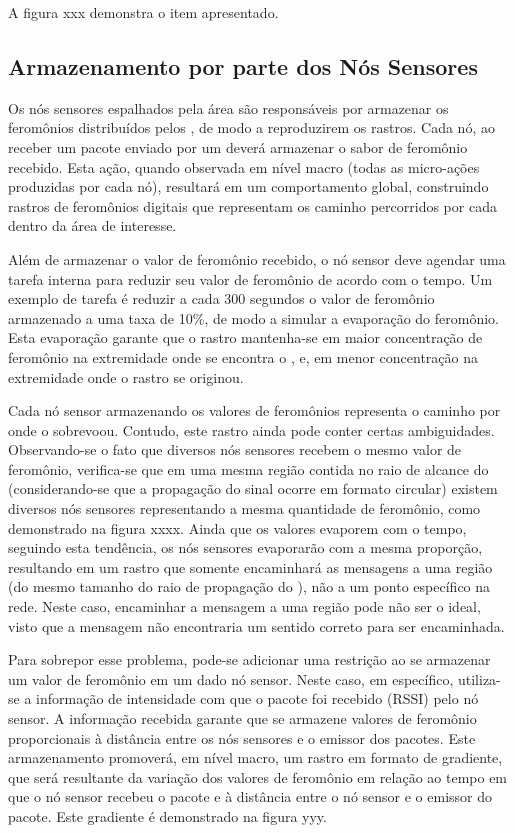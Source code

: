 A figura xxx demonstra o item apresentado.

\subsection{Armazenamento por parte dos Nós Sensores}
Os nós sensores espalhados pela área são responsáveis por armazenar os feromônios distribuídos pelos \vants, de modo a reproduzirem os rastros. Cada nó, ao receber um pacote enviado por um \vant deverá armazenar o sabor de feromônio recebido. Esta ação, quando observada em nível macro (todas as micro-ações produzidas por cada nó), resultará em um comportamento global, construindo rastros de feromônios digitais que representam os caminho percorridos por cada \vant dentro da área de interesse. 

Além de armazenar o valor de feromônio recebido, o nó sensor deve agendar uma tarefa interna para reduzir seu valor de feromônio de acordo com o tempo. Um exemplo de tarefa é reduzir a cada 300 segundos o valor de feromônio armazenado a uma taxa de 10\%, de modo a simular a evaporação do feromônio. Esta evaporação garante que o rastro mantenha-se em maior concentração de feromônio na extremidade onde se encontra o \vant, e, em menor concentração na extremidade onde o rastro se originou.

Cada nó sensor armazenando os valores de feromônios representa o caminho por onde o \vant sobrevoou. Contudo, este rastro ainda pode conter certas ambiguidades. Observando-se o fato que diversos nós sensores recebem o mesmo valor de feromônio, verifica-se que em uma mesma região contida no raio de alcance do \vant (considerando-se que a propagação do sinal ocorre em formato circular) existem diversos nós sensores representando a mesma quantidade de feromônio, como demonstrado na figura xxxx. Ainda que os valores evaporem com o tempo, seguindo esta tendência, os nós sensores evaporarão com a mesma proporção, resultando em um rastro que somente encaminhará as mensagens a uma região (do mesmo tamanho do raio de propagação do \vant), não a um ponto específico na rede. Neste caso, encaminhar a mensagem a uma região pode não ser o ideal, visto que a mensagem não encontraria um sentido correto para ser encaminhada.

Para sobrepor esse problema, pode-se adicionar uma restrição ao se armazenar um valor de feromônio em um dado nó sensor. Neste caso, em específico, utiliza-se a informação de intensidade com que o pacote foi recebido (RSSI) pelo nó sensor. A informação recebida garante que se armazene valores de feromônio proporcionais à distância entre os nós sensores e o emissor dos pacotes. Este armazenamento promoverá, em nível macro, um rastro em formato de gradiente, que será resultante da variação dos valores de feromônio em relação ao tempo em que o nó sensor recebeu o pacote e à distância entre o nó sensor e o \vant emissor do pacote. Este gradiente é demonstrado na figura yyy.

